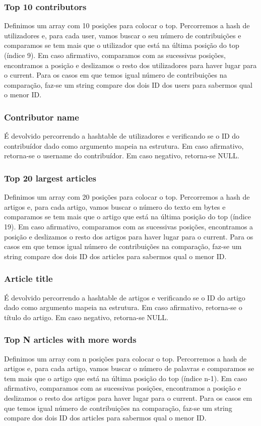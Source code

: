 \documentclass[a4paper]{article}
\begin{document}
\subsubsection{Top 10 contributors}
Definimos um array com 10 posições para colocar o top. Percorremos a hash de utilizadores e, para cada user, vamos buscar o seu número de contribuições e comparamos se tem mais que o utilizador que está na última posição do top (índice 9). Em caso afirmativo, comparamos com as sucessivas posições, encontramos a posição e deslizamos o resto dos utilizadores para haver lugar para o current. Para os casos em que temos igual número de contribuições na comparação, faz-se um string compare dos dois ID dos users para sabermos qual o menor ID.

\subsubsection{Contributor name}
É devolvido percorrendo a hashtable de utilizadores e verificando se o ID do contribuídor dado como argumento mapeia na estrutura. Em caso afirmativo, retorna-se o username do contribuídor. Em caso negativo, retorna-se NULL.

\subsubsection{Top 20 largest articles}
Definimos um array com 20 posições para colocar o top. Percorremos a hash de artigos e, para cada artigo, vamos buscar o número do texto em bytes e comparamos se tem mais que o artigo que está na última posição do top (índice 19). Em caso afirmativo, comparamos com as sucessivas posições, encontramos a posição e deslizamos o resto dos artigos para haver lugar para o current. Para os casos em que temos igual número de contribuições na comparação, faz-se um string compare dos dois ID dos articles para sabermos qual o menor ID.

\subsubsection{Article title}
É devolvido percorrendo a hashtable de artigos e verificando se o ID do artigo dado como argumento mapeia na estrutura. Em caso afirmativo, retorna-se o título do artigo. Em caso negativo, retorna-se NULL.

\subsubsection{Top N articles with more words}
Definimos um array com n posições para colocar o top. Percorremos a hash de artigos e, para cada artigo, vamos buscar o número de palavras e comparamos se tem mais que o artigo que está na última posição do top (índice n-1). Em caso afirmativo, comparamos com as sucessivas posições, encontramos a posição e deslizamos o resto dos artigos para haver lugar para o current. Para os casos em que temos igual número de contribuições na comparação, faz-se um string compare dos dois ID dos articles para sabermos qual o menor ID.
\end{document}
